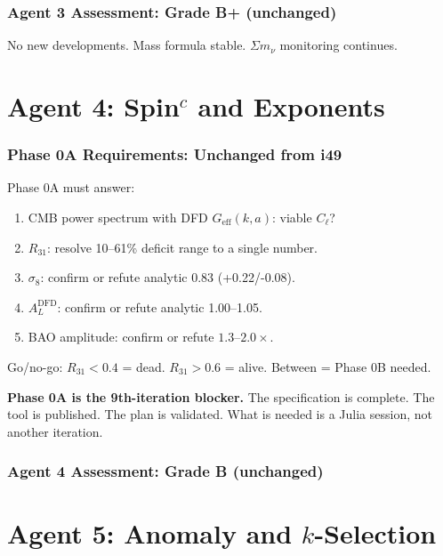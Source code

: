 \documentclass[11pt,a4paper]{article}
\begin{document}
\section{Agent 3 Assessment: Grade B+ (unchanged)}

No new developments. Mass formula stable. $\Sigma m_\nu$ monitoring continues.


\part{Agent 4: Spin$^c$ and Exponents}
\label{part:agent4}

\section{Phase 0A Requirements: Unchanged from i49}

Phase 0A must answer:
\begin{enumerate}
\item CMB power spectrum with DFD $G_\text{eff}(k,a)$: viable $C_\ell$?
\item $R_{31}$: resolve 10--61\% deficit range to a single number.
\item $\sigma_8$: confirm or refute analytic $0.83$ (+0.22/-0.08).
\item $A_L^\text{DFD}$: confirm or refute analytic 1.00--1.05.
\item BAO amplitude: confirm or refute $1.3$--$2.0\times$.
\end{enumerate}

Go/no-go: $R_{31} < 0.4$ = dead. $R_{31} > 0.6$ = alive. Between = Phase 0B needed.

\textbf{Phase 0A is the 9th-iteration blocker.} The specification is complete. The tool is published. The plan is validated. What is needed is a Julia session, not another iteration.

\section{Agent 4 Assessment: Grade B (unchanged)}


\part{Agent 5: Anomaly and $k$-Selection}
\label{part:agent5}
\end{document}
